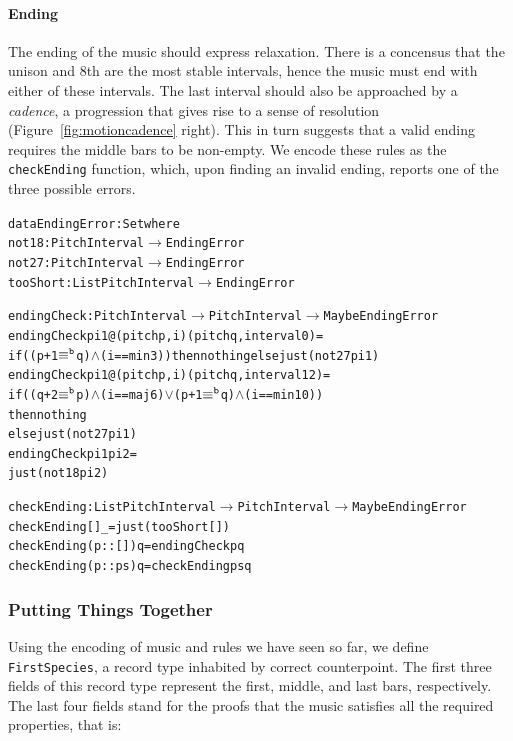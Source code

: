 \paragraph{Ending}

The ending of the music should express relaxation.
There is a concensus that the unison and 8th are the most stable
intervals, hence the music must end with either of these intervals.
The last interval should also be approached by a \emph{cadence},
a progression that gives rise to a sense of resolution
(Figure~\ref{fig:motioncadence} right).
This in turn suggests that a valid ending requires the middle bars
to be non-empty.
We encode these rules as the \texttt{checkEnding} function, which,
upon finding an invalid ending, reports one of the three possible
errors.

\begin{alltt}
data EndingError : Set where
  not18    : PitchInterval \(\rightarrow\) EndingError
  not27    : PitchInterval \(\rightarrow\) EndingError
  tooShort : List PitchInterval \(\rightarrow\) EndingError

endingCheck : PitchInterval \(\rightarrow\) PitchInterval \(\rightarrow\) Maybe EndingError
endingCheck pi1@(pitch p , i) (pitch q , interval 0)  = 
  if ((p + 1 \(\equiv\sp{\mathtt{b}}\) q) \(\wedge\) (i == min3)) then nothing else just (not27 pi1)
endingCheck pi1@(pitch p , i) (pitch q , interval 12) =
  if ((q + 2 \(\equiv\sp{\mathtt{b}}\) p) \(\wedge\) (i == maj6) \(\vee\) (p + 1 \(\equiv\sp{\mathtt{b}}\) q) \(\wedge\) (i == min10))
  then nothing
  else just (not27 pi1)
endingCheck pi1               pi2                     =
  just (not18 pi2)

checkEnding : List PitchInterval \(\rightarrow\) PitchInterval \(\rightarrow\) Maybe EndingError
checkEnding []        \_ = just (tooShort [])
checkEnding (p :: []) q = endingCheck p q
checkEnding (p :: ps) q = checkEnding ps q
\end{alltt}

\subsubsection{Putting Things Together}

Using the encoding of music and rules we have seen so far, we define
\texttt{FirstSpecies}, a record type inhabited by correct counterpoint.
The first three fields of this record type represent the first, middle,
and last bars, respectively.
The last four fields stand for the proofs that the music satisfies all
the required properties, that is:

